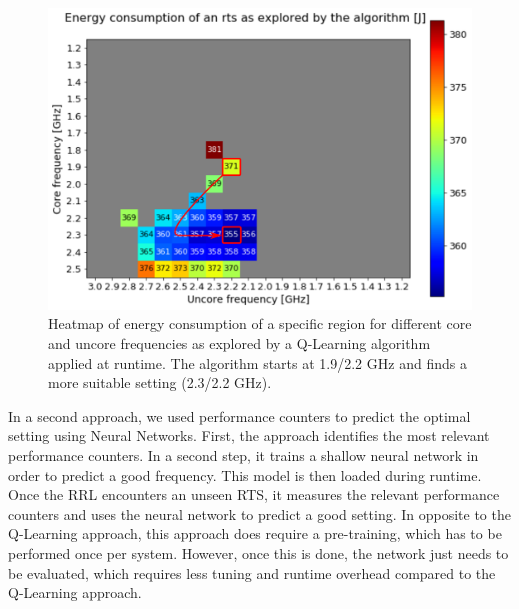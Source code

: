 \begin{figure}[!t]
\centering
\includegraphics[width=.8\columnwidth]{figures/q_learning.png}
\caption{Heatmap of energy consumption of a specific region for different core and uncore frequencies as explored by a Q-Learning algorithm applied at runtime. The algorithm starts at 1.9/2.2 GHz and finds a more suitable setting (2.3/2.2 GHz).}
\label{fig:qlearning}
\end{figure}

In a second approach, we used performance counters to predict the optimal setting using Neural Networks. First, the approach identifies the most relevant performance counters. In a second step, it trains a shallow neural network in order to predict a good frequency. This model is then loaded during runtime. Once the RRL encounters an unseen RTS, it measures the relevant performance counters and uses the neural network to predict a good setting. In opposite to the Q-Learning approach, this approach does require a pre-training, which has to be performed once per system. However, once this is done, the network just needs to be evaluated, which requires less tuning and runtime overhead compared to the Q-Learning approach. 


